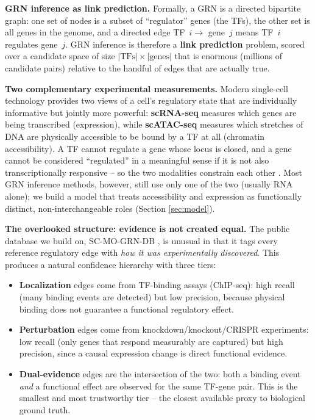 \documentclass{article}
\theoremstyle{plain}
\theoremstyle{definition}
\begin{document}
\textbf{GRN inference as link prediction.} Formally, a GRN is a directed
bipartite graph: one set of nodes is a subset of ``regulator'' genes (the TFs),
the other set is all genes in the genome, and a directed edge TF~$i \to$ gene~$j$
means TF~$i$ regulates gene~$j$. GRN inference is therefore a \textbf{link
prediction} problem, scored over a candidate space of size $|\text{TFs}| \times
|\text{genes}|$ that is enormous (millions of candidate pairs) relative to the
handful of edges that are actually true.

\textbf{Two complementary experimental measurements.} Modern single-cell
technology provides two views of a cell's regulatory state that are individually
informative but jointly more powerful: \textbf{scRNA-seq} measures which genes are
being transcribed (expression), while \textbf{scATAC-seq} measures which
stretches of DNA are physically accessible to be bound by a TF at all
(chromatin accessibility). A TF cannot regulate a gene whose locus is closed, and
a gene cannot be considered ``regulated'' in a meaningful sense if it is not also
transcriptionally responsive -- so the two modalities constrain each other
\cite{duren2018integrative}. Most GRN inference methods, however, still use only
one of the two (usually RNA alone); we build a model that treats accessibility and
expression as functionally distinct, non-interchangeable roles (Section
\ref{sec:model}).

\textbf{The overlooked structure: evidence is not created equal.} The public
database we build on, SC-MO-GRN-DB \cite{valensi2026scmogrndb}, is unusual in that
it tags every reference regulatory edge with \emph{how it was experimentally
discovered}. This produces a natural confidence hierarchy with three tiers:

\begin{itemize}
\item \textbf{Localization} edges come from TF-binding assays (ChIP-seq): high
recall (many binding events are detected) but low precision, because physical
binding does not guarantee a functional regulatory effect.
\item \textbf{Perturbation} edges come from knockdown/knockout/CRISPR
experiments: low recall (only genes that respond measurably are captured) but
high precision, since a causal expression change is direct functional evidence.
\item \textbf{Dual-evidence} edges are the intersection of the two: both a
binding event \emph{and} a functional effect are observed for the same TF-gene
pair. This is the smallest and most trustworthy tier -- the closest available
proxy to biological ground truth.
\end{itemize}
\end{document}
